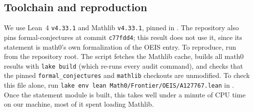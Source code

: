 \documentclass[11pt]{amsart}
\theoremstyle{plain}
\theoremstyle{definition}
\begin{document}
\subsection*{Toolchain and reproduction}
We use Lean~4 \cite{Lean4} \texttt{v4.33.1} and Mathlib \cite{Mathlib} \texttt{v4.33.1}, pinned in . The repository also pins formal-conjectures \cite{FC} at commit \texttt{c77fdd4}; this result does not use it, since its statement is math0's own formalization of the OEIS entry. To reproduce, run  from the repository root. The script fetches the Mathlib cache, builds all math0 results with \texttt{lake build} (which re-runs every audit command), and checks that the pinned \texttt{formal\_conjectures} and \texttt{mathlib} checkouts are unmodified. To check this file alone, run \texttt{lake env lean Math0/Frontier/OEIS/A127767.lean} in . Once the statement module is built, this takes well under a minute of CPU time on our machine, most of it spent loading Mathlib.
\end{document}
